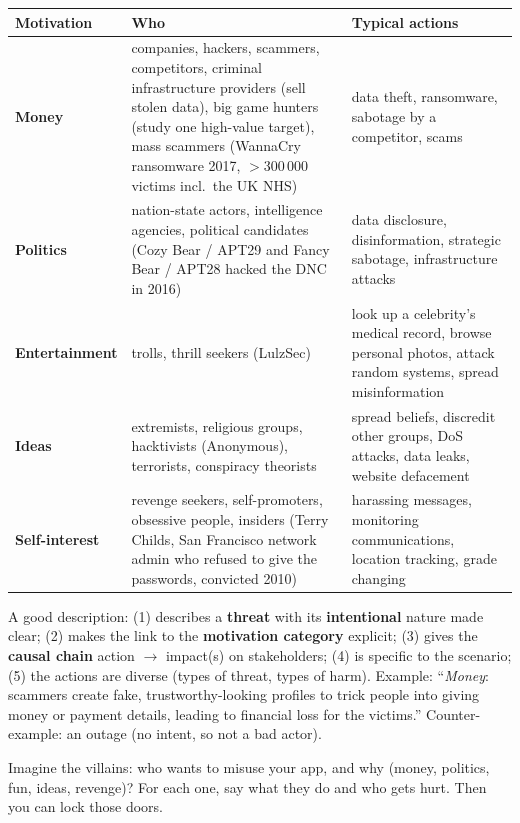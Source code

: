 \documentclass[11pt,a4paper,openany]{book}
\begin{document}
\begin{center}
\begin{tabularx}{\linewidth}{l X X}
\textbf{Motivation} & \textbf{Who} & \textbf{Typical actions} \\ \hline
\textbf{Money} & companies, hackers, scammers, competitors, criminal infrastructure providers
(sell stolen data), big game hunters (study one high-value target), mass scammers (WannaCry
ransomware 2017, $>$300\,000 victims incl.\ the UK NHS) & data theft, ransomware, sabotage by a
competitor, scams \\ \hline
\textbf{Politics} & nation-state actors, intelligence agencies, political candidates (Cozy Bear
/ APT29 and Fancy Bear / APT28 hacked the DNC in 2016) & data disclosure, disinformation,
strategic sabotage, infrastructure attacks \\ \hline
\textbf{Entertainment} & trolls, thrill seekers (LulzSec) & look up a celebrity's medical record,
browse personal photos, attack random systems, spread misinformation \\ \hline
\textbf{Ideas} & extremists, religious groups, hacktivists (Anonymous), terrorists, conspiracy
theorists & spread beliefs, discredit other groups, DoS attacks, data leaks, website defacement
\\ \hline
\textbf{Self-interest} & revenge seekers, self-promoters, obsessive people, insiders (Terry
Childs, San Francisco network admin who refused to give the passwords, convicted 2010) &
harassing messages, monitoring communications, location tracking, grade changing
\end{tabularx}
\end{center}

\begin{keybox}[title={How the case studies are graded}]
A good description: (1) describes a \textbf{threat} with its \textbf{intentional} nature made
clear; (2) makes the link to the \textbf{motivation category} explicit; (3) gives the
\textbf{causal chain} action $\to$ impact(s) on stakeholders; (4) is specific to the scenario;
(5) the actions are diverse (types of threat, types of harm). Example: ``\emph{Money}: scammers
create fake, trustworthy-looking profiles to trick people into giving money or payment details,
leading to financial loss for the victims.'' Counter-example: an outage (no intent, so not a bad
actor).
\end{keybox}

\begin{goatbox}
Imagine the villains: who wants to misuse your app, and why (money, politics, fun, ideas,
revenge)? For each one, say what they do and who gets hurt. Then you can lock those doors.
\end{goatbox}
\end{document}
